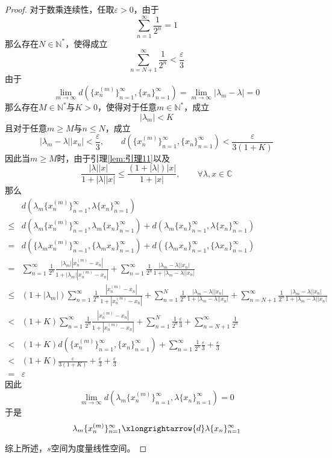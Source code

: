 \documentclass[lang = cn, scheme = chinese, thmcnt = section]{elegantbook}
\newcommand{\N}{\mathbb{N}}            %
\newcommand{\C}{\mathbb{C}}  		   %
\begin{document}
\begin{proof}
	对于数乘连续性，任取$\varepsilon>0$，由于
	$$
	\sum_{n=1}^{\infty}\frac{1}{2^n}=1
	$$
	那么存在$N\in\N^*$，使得成立
	$$
	\sum_{n=N+1}^{\infty}\frac{1}{2^n}<\frac{\varepsilon}{3}
	$$
	由于
	$$
	\lim_{m\to\infty}d(\{x_n^{(m)}\}_{n=1}^{\infty},\{x_n\}_{n=1}^{\infty})= 
	\lim_{m\to\infty}|\lambda_m-\lambda|=0
	$$
	那么存在$M\in\N^*$与$K>0$，使得对于任意$m\in\N^*$，成立
	$$
	|\lambda_m|<K
	$$
	且对于任意$m\ge M$与$n\le N$，成立
	$$
	|\lambda_m-\lambda||x_n|<\frac{\varepsilon}{3},\qquad 
	d(\{x_n^{(m)}\}_{n=1}^{\infty},\{x_n\}_{n=1}^{\infty})<\frac{\varepsilon}{3(1+K)}
	$$
	因此当$m\ge M$时，由于引理\ref{lem:引理11}以及
	$$
	\frac{|\lambda||x|}{1+|\lambda||x|}\le \frac{(1+|\lambda|)|x|}{1+|x|},\qquad \forall \lambda,x\in\C
	$$
	那么
	\begin{align*}
		& d(\lambda_m\{x_n^{(m)}\}_{n=1}^{\infty},
		\lambda\{x_n\}_{n=1}^{\infty})\\
		\le &   d(\lambda_m\{x_n^{(m)}\}_{n=1}^{\infty},
		\lambda_m\{x_n\}_{n=1}^{\infty})+
		d(\lambda_m\{x_n\}_{n=1}^{\infty},\lambda\{x_n\}_{n=1}^{\infty})\\
		= & d(\{\lambda_mx_n^{(m)}\}_{n=1}^{\infty},
		\{\lambda_mx_n\}_{n=1}^{\infty})+
		d(\{\lambda_mx_n\}_{n=1}^{\infty},\{ \lambda x_n\}_{n=1}^{\infty})\\
		= & \sum_{n=1}^{\infty}\frac{1}{2^n}\frac{|\lambda_m||x_n^{(m)}-x_n|}{1+|\lambda_m||x_n^{(m)}-x_n|}
		+\sum_{n=1}^{\infty}\frac{1}{2^n}\frac{|\lambda_m-\lambda||x_n|}{1+|\lambda_m-\lambda||x_n|}\\
		\le & (1+|\lambda_m|)\sum_{n=1}^{\infty}\frac{1}{2^n}\frac{|x_n^{(m)}-x_n|}{1+|x_n^{(m)}-x_n|}
		+\sum_{n=1}^{N}\frac{1}{2^n}\frac{|\lambda_m-\lambda||x_n|}{1+|\lambda_m-\lambda||x_n|}
		+\sum_{n=N+1}^{\infty}\frac{1}{2^n}\frac{|\lambda_m-\lambda||x_n|}{1+|\lambda_m-\lambda||x_n|}\\
		< & (1+K)\sum_{n=1}^{\infty}\frac{1}{2^n}\frac{|x_n^{(m)}-x_n|}{1+|x_n^{(m)}-x_n|}
		+\sum_{n=1}^{N}\frac{1}{2^n}\frac{\varepsilon}{3}
		+\sum_{n=N+1}^{\infty}\frac{1}{2^n}\\
		< & (1+K)d(\{x_n^{(m)}\}_{n=1}^{\infty},\{x_n\}_{n=1}^{\infty})
		+\sum_{n=1}^{\infty}\frac{1}{2^n}\frac{\varepsilon}{3}+\frac{\varepsilon}{3}\\
		< & (1+K)\frac{\varepsilon}{3(1+K)}+\frac{\varepsilon}{3}+\frac{\varepsilon}{3}\\
		= & \varepsilon
	\end{align*}
	因此
	$$
	\lim_{m\to\infty}d(\lambda_m\{x_n^{(m)}\}_{n=1}^{\infty},
	\lambda\{x_n\}_{n=1}^{\infty})=0
	$$
	于是
	$$
	\lambda_m\{x_n^{(m)}\}_{n=1}^{\infty}\xlongrightarrow{d}\lambda\{x_n\}_{n=1}^{\infty}
	$$
	
	综上所述，$s$空间为度量线性空间。
\end{proof}
\end{document}
